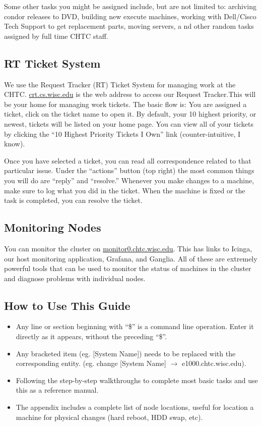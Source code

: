 \documentclass[10pt,letterpaper]{article}
\begin{document}
        Some other tasks you might be assigned include, but are not limited to:
        archiving condor releases to DVD, building new execute machines, working
        with Dell/Cisco Tech Support to get replacement parts, moving servers, a
        nd other random tasks assigned by full time CHTC staff.
    \subsection{RT Ticket System}
        We use the Request Tracker (RT) Ticket System for managing work at the CHTC.
        \href{https://crt.cs.wisc.edu/rt/}{crt.cs.wisc.edu} is the web address to
        access our Request Tracker.This will be your home for managing work tickets.
        The basic flow is: You are assigned a ticket, click on the ticket name to
        open it. By default, your 10 highest priority, or newest, tickets will be
        listed on your home page. You can view all of your tickets by clicking the
        “10 Highest Priority Tickets I Own” link (counter-intuitive, I know).

        Once you have selected a ticket, you can read all correspondence related
        to that particular issue. Under the “actions” button (top right) the most
        common things you will do are “reply” and “resolve.” Whenever you make
        changes to a machine, make sure to log what you did in the ticket. When
        the machine is fixed or the task is completed, you can resolve the ticket.

    \subsection{Monitoring Nodes}
        You can monitor the cluster on \href{monitor0.chtc.wisc.edu}{monitor0.chtc.wisc.edu}.
        This has links to Icinga, our host monitoring application, Grafana, and Ganglia.
        All of these are extremely powerful tools that can be used to monitor the
        status of machines in the cluster and diagnose problems with individual nodes.

    \subsection{How to Use This Guide}
        \begin{itemize}
            \item Any line or section beginning with “\$” is a command line operation.
            Enter it directly as it appears, without the preceding “\$”.
            \item Any bracketed item (eg. [System Name]) needs to be replaced with
            the corresponding entity. (eg. change [System Name] $\rightarrow$
            e1000.chtc.wisc.edu).
            \item Following the step-by-step walkthroughs to complete most basic
            tasks and use this as a reference manual.
            \item The appendix includes a complete list of node locations, useful
            for location a machine for physical changes (hard reboot, HDD swap, etc).
        \end{itemize}
\end{document}
